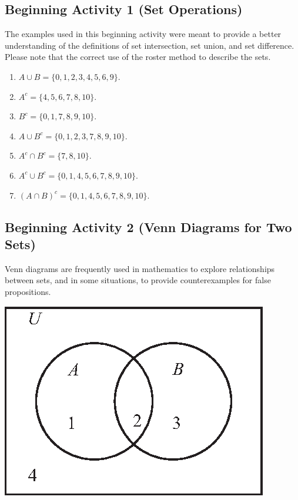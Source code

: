 \documentclass[11pt]{article}
\begin{document}
\subsection*{Beginning Activity 1 (Set Operations)}
The examples used in this beginning activity were meant to provide a better understanding of the definitions of set intersection, set union, and set difference. Please note that the correct use of the roster method to describe the sets.
\begin{multicols}{2}
\begin{enumerate}
  \item $A \cup B = \{0, 1, 2, 3, 4, 5, 6, 9 \}$.
  \item $A^c = \{4, 5, 6, 7, 8, 10 \}$.
  \item $B^c = \{0, 1, 7, 8, 9, 10 \}$.
  \item $A \cup B^c = \{0, 1, 2, 3, 7, 8, 9, 10 \}$.
  \item $A^c \cap B^c = \{ 7, 8, 10 \}$.
  \item $A^c \cup B^c = \{0, 1, 4, 5, 6, 7, 8, 9, 10 \}$.
  \item $(A \cap B)^c = \{0, 1, 4, 5, 6, 7, 8, 9, 10 \}$.
\end{enumerate}
\end{multicols}
\hbreak



\subsection*{Beginning Activity 2 (Venn Diagrams for Two Sets)}
Venn diagrams are frequently used in mathematics to explore relationships between sets, and in some situations, to provide counterexamples for false propositions.
\begin{center}
\includegraphics{figps-venn2.eps}
\end{center}
\end{document}
